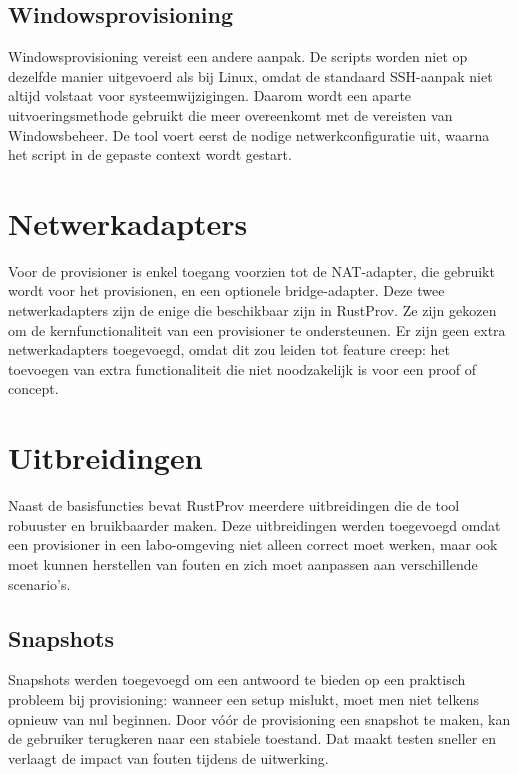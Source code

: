 \subsection{Windowsprovisioning}

Windowsprovisioning vereist een andere aanpak. De scripts worden niet op dezelfde manier uitgevoerd als bij Linux, omdat de standaard SSH-aanpak niet altijd volstaat voor systeemwijzigingen. Daarom wordt een aparte uitvoeringsmethode gebruikt die meer overeenkomt met de vereisten van Windowsbeheer. De tool voert eerst de nodige netwerkconfiguratie uit, waarna het script in de gepaste context wordt gestart. 


\section{Netwerkadapters}

Voor de provisioner is enkel toegang voorzien tot de NAT-adapter, die gebruikt wordt voor het provisionen, en een optionele bridge-adapter. Deze twee netwerkadapters zijn de enige die beschikbaar zijn in RustProv. Ze zijn gekozen om de kernfunctionaliteit van een provisioner te ondersteunen. Er zijn geen extra netwerkadapters toegevoegd, omdat dit zou leiden tot feature creep: het toevoegen van extra functionaliteit die niet noodzakelijk is voor een proof of concept.


\section{Uitbreidingen}

Naast de basisfuncties bevat RustProv meerdere uitbreidingen die de tool robuuster en bruikbaarder maken. Deze uitbreidingen werden toegevoegd omdat een provisioner in een labo-omgeving niet alleen correct moet werken, maar ook moet kunnen herstellen van fouten en zich moet aanpassen aan verschillende scenario's. 

\subsection{Snapshots}

Snapshots werden toegevoegd om een antwoord te bieden op een praktisch probleem bij provisioning: wanneer een setup mislukt, moet men niet telkens opnieuw van nul beginnen. Door vóór de provisioning een snapshot te maken, kan de gebruiker terugkeren naar een stabiele toestand. Dat maakt testen sneller en verlaagt de impact van fouten tijdens de uitwerking. 

